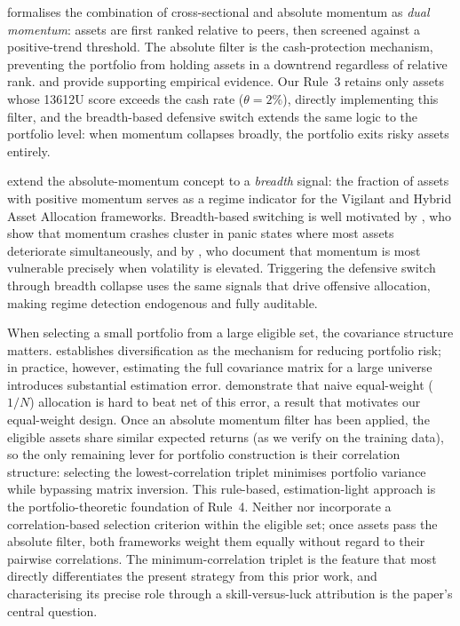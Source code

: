 \citet{antonacci2014} formalises the combination of cross-sectional and absolute momentum as \emph{dual momentum}: assets are first ranked relative to peers, then screened against a positive-trend threshold. The absolute filter is the cash-protection mechanism, preventing the portfolio from holding assets in a downtrend regardless of relative rank. \citet{antonacci2012} and \citet{antonacci2015} provide supporting empirical evidence. Our Rule~3 retains only assets whose 13612U score exceeds the cash rate ($\theta = 2\%$), directly implementing this filter, and the breadth-based defensive switch extends the same logic to the portfolio level: when momentum collapses broadly, the portfolio exits risky assets entirely.

\citet{keller2017} extend the absolute-momentum concept to a \emph{breadth} signal: the fraction of assets with positive momentum serves as a regime indicator for the Vigilant and Hybrid Asset Allocation frameworks. Breadth-based switching is well motivated by \citet{daniel2016}, who show that momentum crashes cluster in panic states where most assets deteriorate simultaneously, and by \citet{barroso2015}, who document that momentum is most vulnerable precisely when volatility is elevated. Triggering the defensive switch through breadth collapse uses the same signals that drive offensive allocation, making regime detection endogenous and fully auditable.

When selecting a small portfolio from a large eligible set, the covariance structure matters. \citet{markowitz1952} establishes diversification as the mechanism for reducing portfolio risk; in practice, however, estimating the full covariance matrix for a large universe introduces substantial estimation error. \citet{demiguel2009} demonstrate that naive equal-weight ($1/N$) allocation is hard to beat net of this error, a result that motivates our equal-weight design. Once an absolute momentum filter has been applied, the eligible assets share similar expected returns (as we verify on the training data), so the only remaining lever for portfolio construction is their correlation structure: selecting the lowest-correlation triplet minimises portfolio variance while bypassing matrix inversion. This rule-based, estimation-light approach is the portfolio-theoretic foundation of Rule~4. Neither \citet{faber2007} nor \citet{keller2017} incorporate a correlation-based selection criterion within the eligible set; once assets pass the absolute filter, both frameworks weight them equally without regard to their pairwise correlations. The minimum-correlation triplet is the feature that most directly differentiates the present strategy from this prior work, and characterising its precise role through a skill-versus-luck attribution is the paper's central question.


